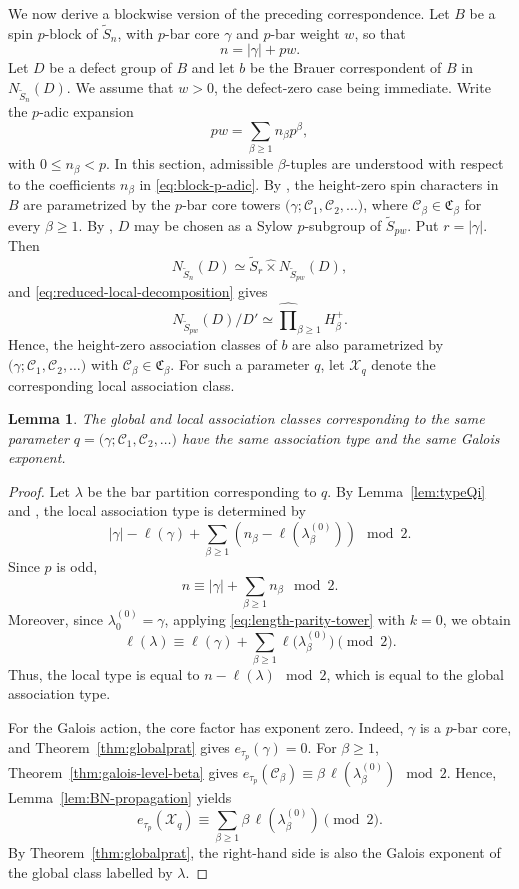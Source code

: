 \documentclass[reqno]{amsart}
\newcommand{\tSym}{\widetilde{S}}
\newtheorem{lemma}[theorem]{Lemma}     %
\theoremstyle{definition}
\begin{document}
We now derive a blockwise version of the preceding correspondence.
Let $B$ be a spin $p$-block of $\tSym_n$, with $p$-bar core $\gamma$
and $p$-bar weight $w$, so that
\[
n=|\gamma|+pw.
\]
Let $D$ be a defect group of $B$ and let $b$ be the Brauer correspondent
of $B$ in $N_{\tSym_n}(D)$. We assume that $w>0$, the defect-zero case
being immediate.
Write the $p$-adic expansion 
\begin{equation}
\label{eq:block-p-adic}
pw=\sum_{\beta\geq1}n_\beta p^\beta,
\end{equation}
with $ 0\leq n_\beta<p$.
In this section, admissible $\beta$-tuples are understood with respect
to the coefficients $n_\beta$ in \eqref{eq:block-p-adic}.
By \cite[Theorem~13.1 and Proposition~13.8]{olsson}, the height-zero
spin characters in $B$ are parametrized by the $p$-bar core towers
$
\bigl(
\gamma;
\mathcal C_1,\mathcal C_2,\ldots
\bigr)$, 
where $\mathcal C_\beta\in\mathfrak C_\beta$ for every $\beta\geq1$.
By \cite[Proposition~13.3]{olsson}, $D$ may be chosen as a Sylow
$p$-subgroup of $\tSym_{pw}$. Put $r=|\gamma|$. Then
\[
N_{\tSym_n}(D)
\simeq
\tSym_r
\widehat\times
N_{\tSym_{pw}}(D),
\]
and \eqref{eq:reduced-local-decomposition} gives
\[
N_{\tSym_{pw}}(D)/D'
\simeq
\widehat{\prod}_{\beta\geq1}H_\beta^+.
\]
Hence, the height-zero association classes of $b$ are also parametrized by
$
\bigl(
\gamma;
\mathcal C_1,\mathcal C_2,\ldots
\bigr)
$
with $\mathcal C_\beta\in\mathfrak C_\beta$. For such a parameter $q$, let
$\mathcal X_q$ denote the corresponding local association class.

\begin{lemma}
\label{lem:block-same-type-bit}
The global and local association classes corresponding to the same
parameter
$
q=
\bigl(
\gamma;
\mathcal C_1,\mathcal C_2,\ldots
\bigr)
$
have the same association type and the same Galois exponent.
\end{lemma}

\begin{proof}
Let $\lambda$ be the bar partition corresponding to $q$. By
Lemma~\ref{lem:typeQi} and \cite[Proposition 1.2]{MichlerOlsson}, the
local association type is determined by
\[
|\gamma|-\ell(\gamma)
+
\sum_{\beta\geq1}
\left(
n_\beta-\ell(\lambda_\beta^{(0)})
\right)
\mod2.
\]
Since $p$ is odd,
\[
n
\equiv
|\gamma|+\sum_{\beta\geq1}n_\beta
\mod2.
\]
Moreover, since $\lambda_0^{(0)}=\gamma$,
applying \eqref{eq:length-parity-tower} with $k=0$, we obtain
\[
\ell(\lambda)
\equiv
\ell(\gamma)
+
\sum_{\beta\geq1}
\ell\bigl(\lambda_\beta^{(0)}\bigr)
\pmod2.
\]
Thus, the local type is equal to $ n-\ell(\lambda)\mod2 $, which is equal
to the global association type.

For the Galois action, the core factor has exponent zero. Indeed,
$\gamma$ is a $p$-bar core, and Theorem~\ref{thm:globalprat} gives
$
e_{\tau_p}(\gamma)=0$.
For $\beta\geq1$, Theorem~\ref{thm:galois-level-beta} gives
$
e_{\tau_p}(\mathcal C_\beta)
\equiv
\beta\,\ell(\lambda_\beta^{(0)})
\mod2$.
Hence, Lemma~\ref{lem:BN-propagation} yields
\[
e_{\tau_p}(\mathcal X_q)
\equiv
\sum_{\beta\geq1}
\beta\,\ell(\lambda_\beta^{(0)})
\pmod2.
\]
By Theorem~\ref{thm:globalprat}, the right-hand side is also the
Galois exponent of the global class labelled by $\lambda$.
\end{proof}
\end{document}
